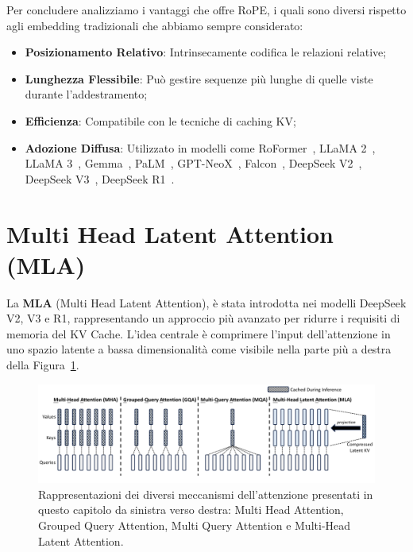 Per concludere analizziamo i vantaggi che offre RoPE, i quali sono diversi rispetto agli embedding tradizionali che abbiamo sempre considerato:
\begin{itemize}
    \item \textbf{Posizionamento Relativo}: Intrinsecamente codifica le relazioni relative;
    \item \textbf{Lunghezza Flessibile}: Può gestire sequenze più lunghe di quelle viste durante l'addestramento;
    \item \textbf{Efficienza}: Compatibile con le tecniche di caching KV;
    \item \textbf{Adozione Diffusa}: Utilizzato in modelli come RoFormer~\cite{su2021roformer}, LLaMA 2~\cite{touvron2023llama}, LLaMA 3~\cite{touvron2024llama3}, Gemma~\cite{google2024gemma}, PaLM~\cite{chowdhery2022palm}, GPT-NeoX~\cite{black2022gptneox}, Falcon~\cite{penedo2023falcon}, DeepSeek V2~\cite{deepseek2023v2}, DeepSeek V3~\cite{deepseek2024v3}, DeepSeek R1~\cite{deepseek2024r1}.
\end{itemize}

\section{Multi Head Latent Attention (MLA)}

La \textbf{MLA} (Multi Head Latent Attention), è stata introdotta nei modelli DeepSeek V2, V3 e R1, rappresentando un approccio più avanzato per ridurre i requisiti di memoria del KV Cache. L'idea centrale è comprimere l'input dell'attenzione in uno spazio latente a bassa dimensionalità come visibile nella parte più a destra della Figura~\ref{fig:diffAttention}.


\begin{figure}
    \centering
    \includegraphics[width=\textwidth]{figure/DifferentAttention.png}
    \caption{Rappresentazioni dei diversi meccanismi dell'attenzione presentati in questo capitolo da sinistra verso destra: Multi Head Attention, Grouped Query Attention, Multi Query Attention e Multi-Head Latent Attention.}
    \label{fig:diffAttention}
\end{figure}

